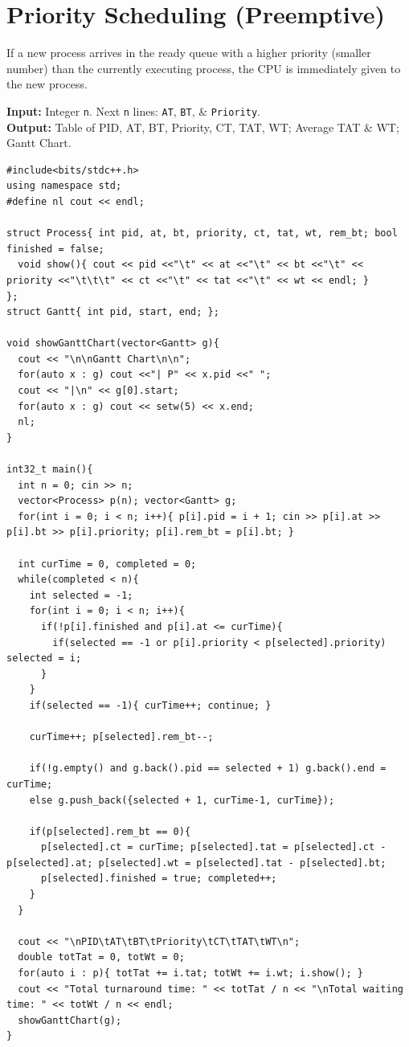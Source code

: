 \documentclass[10pt, a4paper]{article}
\begin{document}
\section{Priority Scheduling (Preemptive)}
If a new process arrives in the ready queue with a higher priority (smaller number) than the currently executing process, the CPU is immediately given to the new process.

\begin{tcolorbox}[title=Input \& Output Format, iobox]
\textbf{Input:} Integer \texttt{n}. Next \texttt{n} lines: \texttt{AT}, \texttt{BT}, \& \texttt{Priority}.\\
\textbf{Output:} Table of PID, AT, BT, Priority, CT, TAT, WT; Average TAT \& WT; Gantt Chart.
\end{tcolorbox}

\begin{lstlisting}
#include<bits/stdc++.h>
using namespace std;
#define nl cout << endl;

struct Process{ int pid, at, bt, priority, ct, tat, wt, rem_bt; bool finished = false;
  void show(){ cout << pid <<"\t" << at <<"\t" << bt <<"\t" << priority <<"\t\t\t" << ct <<"\t" << tat <<"\t" << wt << endl; }
};
struct Gantt{ int pid, start, end; };

void showGanttChart(vector<Gantt> g){
  cout << "\n\nGantt Chart\n\n";
  for(auto x : g) cout <<"| P" << x.pid <<" ";
  cout << "|\n" << g[0].start;
  for(auto x : g) cout << setw(5) << x.end;
  nl;
}

int32_t main(){
  int n = 0; cin >> n;
  vector<Process> p(n); vector<Gantt> g;
  for(int i = 0; i < n; i++){ p[i].pid = i + 1; cin >> p[i].at >> p[i].bt >> p[i].priority; p[i].rem_bt = p[i].bt; }

  int curTime = 0, completed = 0;
  while(completed < n){
    int selected = -1;
    for(int i = 0; i < n; i++){
      if(!p[i].finished and p[i].at <= curTime){
        if(selected == -1 or p[i].priority < p[selected].priority) selected = i;
      }
    }
    if(selected == -1){ curTime++; continue; }
    
    curTime++; p[selected].rem_bt--;

    if(!g.empty() and g.back().pid == selected + 1) g.back().end = curTime;
    else g.push_back({selected + 1, curTime-1, curTime});

    if(p[selected].rem_bt == 0){
      p[selected].ct = curTime; p[selected].tat = p[selected].ct - p[selected].at; p[selected].wt = p[selected].tat - p[selected].bt;
      p[selected].finished = true; completed++;
    }
  }
  
  cout << "\nPID\tAT\tBT\tPriority\tCT\tTAT\tWT\n";
  double totTat = 0, totWt = 0;
  for(auto i : p){ totTat += i.tat; totWt += i.wt; i.show(); }
  cout << "Total turnaround time: " << totTat / n << "\nTotal waiting time: " << totWt / n << endl;
  showGanttChart(g);
}
\end{lstlisting}
\newpage
\end{document}
